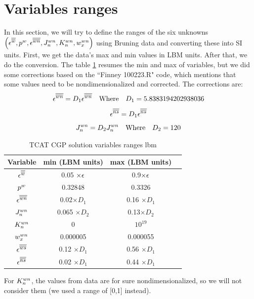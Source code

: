 \documentclass{article}
\begin{document}
\section{Variables ranges}
In this section, we will try to define the ranges of the six unknowns \(\left( {{{\epsilon}^{{\overline{\overline{w}}}}}}, {{{p_{}^{w}}}}, {{{\epsilon}^{{\overline{\overline{{wn}}}}}}}, J_n^{wn}, K_n^{wn}, w_x^{wn} \right)\) using Bruning data and converting these into SI units. First, we get the data's max and min values in LBM units. After that, we do the conversion. The table \ref{table:5} resumes the min and max of variables, but we did some corrections based on the ``Finney 100223.R" code, which mentions that some values need to be nondimensionalized and corrected. The corrections are:
\begin{equation}
{{{{\ensuremath{\epsilon}}^{{\overline{\overline{{\ensuremath{wn}}}}}}}}}=D_1 {{{{\epsilon}^{{\overline{\overline{{wn}}}}}}}}  \quad \textrm{Where} \quad D_1=5.8383194202938036 
\label{eq:ewn_correction}
\end{equation}
\begin{equation}
{{{{\ensuremath{\epsilon}}^{{\overline{\overline{{\ensuremath{ns}}}}}}}}}=D_1 {{{{\epsilon}^{{\overline{\overline{{ns}}}}}}}} 
\label{eq:ens_correction}
\end{equation}
\begin{equation}
{J_n^{\ensuremath{wn}}}=D_2 {J_n^{wn}}  \quad \textrm{Where} \quad D_2=120 
\label{eq:Jwn_correction}
\end{equation}
 \begin{table}[h!]
\centering
 \begin{tabular}{ c c  c c} 
 \hline
Variable   & min (LBM units) &  max (LBM units)\\  [1ex]
 \hline
\( {{{\epsilon}^{{\overline{\overline{w}}}}}}\)  &  0.05 \(\times {\ensuremath{\epsilon}} \)  & 0.9\(\times {\ensuremath{\epsilon}} \)   \\
\( {{{p_{}^{w}}}}\)  &  0.32848 & 0.3326    \\
\( {{{\epsilon}^{{\overline{\overline{{wn}}}}}}}\)  &  0.02\( \times D_1 \) & 0.16 \( \times D_1 \) \\
\( J_n^{wn}\)  &  0.065 \( \times D_2 \)& 0.13\( \times D_2 \)  \\
\(K_n^{wn}\)  &  0  &\( 10^{19}\)  \\
\(w_x^{wn}\)  & 0.000005   & 0.000055 \\
\({{{\epsilon}^{{\overline{\overline{{ws}}}}}}}\)  &  0.12 \( \times D_1 \) & 0.56 \( \times D_1 \)\\
\({{{\epsilon}^{{\overline{\overline{{ns}}}}}}}\)  &  0.02 \( \times D_1 \) & 0.44 \( \times D_1 \)\\[1ex] 
 \hline
 \end{tabular}
 \caption{TCAT CGP solution variables ranges lbm}
\label{table:5}
\end{table}
For \(K_n^{wn}\), the values from data are for sure nondimensionalized, so we will not consider them (we used a range of [0,1] instead). 
\end{document}
